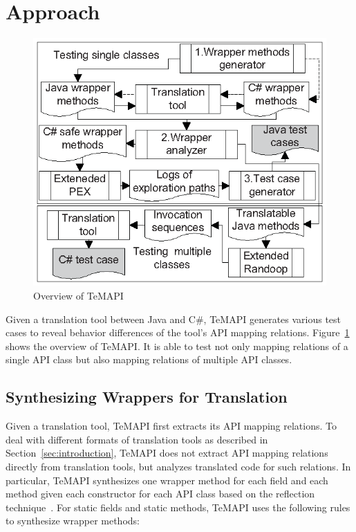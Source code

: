 \section{Approach}
\label{sec:approach}
\begin{figure}[t]
\centering
\includegraphics[scale=1,clip]{figure/approach.eps}\vspace*{-3ex}
 \caption{Overview of TeMAPI}\vspace*{-4ex}
 \label{fig:approach}
\end{figure}
Given a translation tool between Java and C\#, TeMAPI generates various test cases to reveal behavior differences of the tool's API mapping relations.
Figure~\ref{fig:approach} shows the overview of TeMAPI. It is able to test not only mapping relations of a single API class but also mapping relations of multiple API classes.


\subsection{Synthesizing Wrappers for Translation}
\label{sec:approach:generating}
Given a translation tool, TeMAPI first extracts its API mapping relations. To deal with different formats of translation tools as described in Section~\ref{sec:introduction}, TeMAPI does not extract API mapping relations directly from translation tools, but analyzes translated code for such relations. In particular, TeMAPI synthesizes one wrapper method for each field and each method given each constructor for each API class based on the reflection technique~\cite{maes1987concepts}. For static fields and static methods, TeMAPI uses the following rules to synthesize wrapper methods:

